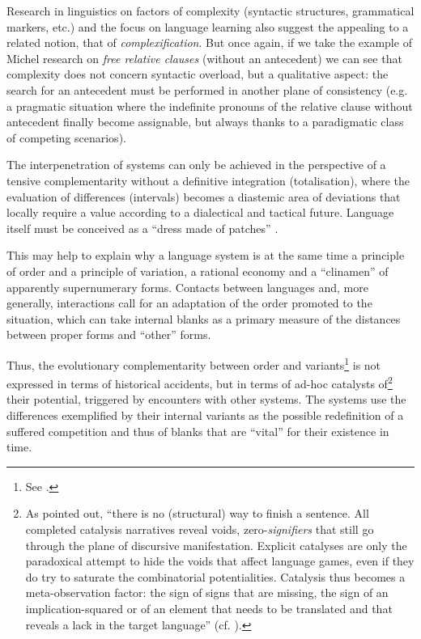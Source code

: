 \documentclass[output=paper]{langscibook}
\begin{document}
Research in linguistics on factors of complexity (syntactic structures, grammatical markers, etc.) and the focus on language learning also suggest the appealing to a related notion, that of \textit{complexification}. But once again, if we take the example of Michel  research on \textit{free relative clauses} (without an antecedent) we can see that complexity does not concern syntactic overload, but a qualitative aspect: the search for an antecedent must be performed in another plane of consistency (e.g. a pragmatic situation where the indefinite pronouns of the relative clause without antecedent finally become assignable, but always thanks to a paradigmatic class of competing scenarios). 

The interpenetration of systems can only be achieved in the perspective of a tensive complementarity without a definitive integration (totalisation), where the evaluation of differences (intervals) becomes a diastemic area of deviations that locally require a value according to a dialectical and tactical future. Language itself must be conceived as a “dress made of patches” \citep[132]{Saussure1907}.

This may help to explain why a language system is at the same time a principle of order and a principle of variation, a rational economy and a “clinamen” of apparently supernumerary forms. Contacts between languages and, more generally, interactions call for an adaptation of the order promoted to the situation, which can take internal blanks as a primary measure of the distances between proper forms and “other” forms. 

Thus, the evolutionary complementarity between order and variants\footnote{See \citet{GershersonFernandez2012}.}  is not expressed in terms of historical accidents, but in terms of ad-hoc catalysts of\footnote{As \citet[814]{Barthes1971} pointed out, “there is no (structural) way to finish a sentence. All completed catalysis narratives reveal voids, zero-\textit{signifiers} that still go through the plane of discursive manifestation. Explicit catalyses are only the paradoxical attempt to hide the voids that affect language games, even if they do try to saturate the combinatorial potentialities. Catalysis thus becomes a meta-observation factor: the sign of signs that are missing, the sign of an implication-squared or of an element that needs to be translated and that reveals a lack in the target language” (cf. \citealt{BassoFossali2016}).}  their potential, triggered by encounters with other systems. The systems use the differences exemplified by their internal variants as the possible redefinition of a suffered competition and thus of blanks that are “vital” for their existence in time. 
\end{document}
